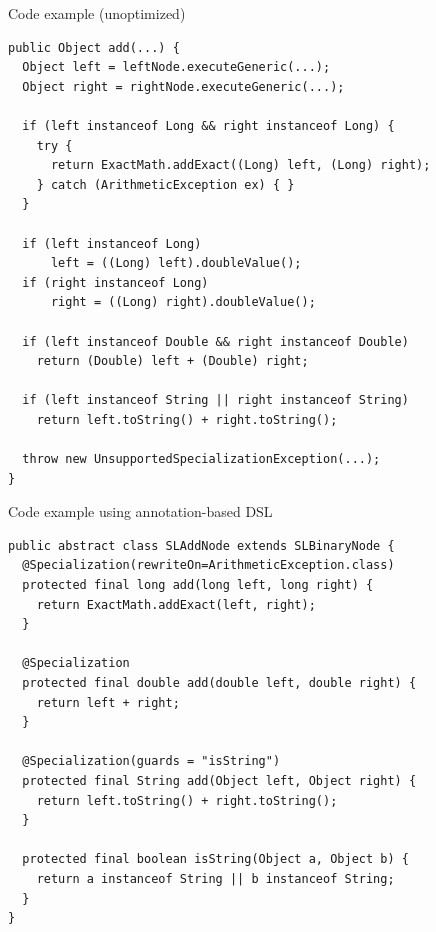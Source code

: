 \documentclass[xcolor=dvipsname,handout]{beamer} %
\begin{document}
\begin{frame}[fragile]{Code example (unoptimized)}
\begin{lstlisting}
public Object add(...) {
  Object left = leftNode.executeGeneric(...);
  Object right = rightNode.executeGeneric(...);

  if (left instanceof Long && right instanceof Long) {
    try {
      return ExactMath.addExact((Long) left, (Long) right);
    } catch (ArithmeticException ex) { }
  }

  if (left instanceof Long) 
      left = ((Long) left).doubleValue();
  if (right instanceof Long) 
      right = ((Long) right).doubleValue();
 	
  if (left instanceof Double && right instanceof Double)
    return (Double) left + (Double) right;

  if (left instanceof String || right instanceof String)
    return left.toString() + right.toString();

  throw new UnsupportedSpecializationException(...);
}
\end{lstlisting}
\end{frame}

\begin{frame}[fragile]{Code example using annotation-based DSL}
  \begin{lstlisting}
public abstract class SLAddNode extends SLBinaryNode {
  @Specialization(rewriteOn=ArithmeticException.class)
  protected final long add(long left, long right) {
    return ExactMath.addExact(left, right);
  }
    
  @Specialization 
  protected final double add(double left, double right) {
    return left + right;
  }
    
  @Specialization(guards = "isString")
  protected final String add(Object left, Object right) {
    return left.toString() + right.toString();
  }
    
  protected final boolean isString(Object a, Object b) {
    return a instanceof String || b instanceof String;
  }
}
  \end{lstlisting}
\end{frame}
\end{document}
